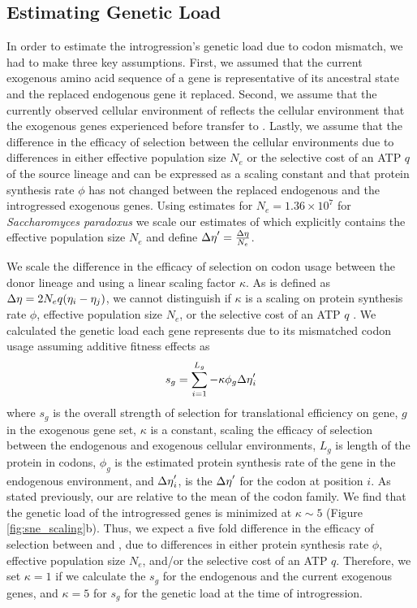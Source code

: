 \documentclass[fleqn,letterpaper]{article}
\begin{document}
\subsection*{Estimating Genetic Load}

In order to estimate the introgression's genetic load due to codon mismatch, we had to make three key assumptions.
First, we assumed that the current exogenous amino acid sequence of a gene is representative of its ancestral state and the replaced endogenous gene it replaced.
Second, we assume that the currently observed cellular environment of \gossypii reflects the cellular environment that the exogenous genes experienced before transfer to \kluyveri.
Lastly, we assume that the difference in the efficacy of selection between the cellular environments due to differences in either effective population size $N_e$ or the selective cost of an ATP $q$ of the source lineage and \kluyveri can be expressed as a scaling constant and that protein synthesis rate $\phi$ has not changed between the replaced endogenous and the introgressed exogenous genes.
Using estimates for $N_e = 1.36\times10^7$ \citep{wagner2005} for \textit{Saccharomyces paradoxus} we scale our estimates of \DE which explicitly contains the effective population size $N_e$ \citep{gilchrist2015} and define ${\Delta \eta}' = \frac{{\Delta \eta}}{N_e}$.

We scale the difference in the efficacy of selection on codon usage between the donor lineage and \kluyveri using a linear scaling factor $\kappa$.
As \DE is defined as ${\Delta \eta} = 2N_eq(\eta_i-\eta_j)$, we cannot distinguish if $\kappa$ is a scaling on protein synthesis rate $\phi$, effective population size $N_e$, or the selective cost of an ATP $q$ \citep{gilchrist2007, gilchrist2015}.
We calculated the genetic load each gene represents due to its mismatched codon usage assuming additive fitness effects as 
\begin{equation}
s_g = \sum_{i=1}^{L_g} -\kappa \phi_g {\Delta \eta}'_i
\label{equ:sg}
\end{equation}
where $s_g$ is the overall strength of selection for translational efficiency on gene, $g$  in the exogenous gene set, $\kappa$ is a constant, scaling the efficacy of selection between the endogenous and exogenous cellular environments, $L_{g}$ is length of the protein in codons, $\phi_g$ is the estimated protein synthesis rate of the gene in the endogenous environment, and ${\Delta \eta}'_i$, is the ${\Delta \eta}'$ for the codon at position $i$.
As stated previously, our \DE are relative to the mean of the codon family.
We find that the genetic load of the introgressed genes is minimized at $\kappa \sim 5$ (Figure \ref{fig:sne_scaling}b).
Thus, we expect a five fold difference in the efficacy of selection between \kluyveri and \gossypii, due to differences in either protein synthesis rate $\phi$, effective population size $N_e$, and/or the selective cost of an ATP $q$.
Therefore, we set $\kappa = 1$ if we calculate the $s_g$ for the endogenous and the current exogenous genes, and $\kappa = 5$ for $s_g$ for the genetic load at the time of introgression.
\end{document}
